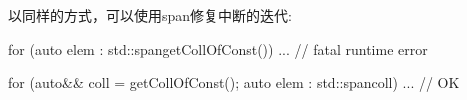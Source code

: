以同样的方式，可以使用span修复中断的迭代:

\begin{cpp}
for (auto elem : std::span{getCollOfConst()}) ... // fatal runtime error

for (auto&& coll = getCollOfConst(); auto elem : std::span{coll}) ... // OK
\end{cpp}
























